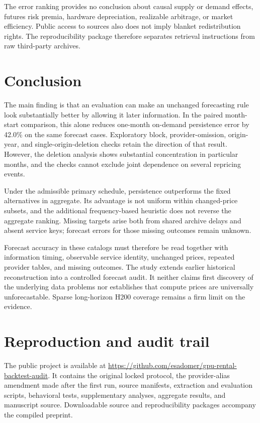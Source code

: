 \documentclass[10pt]{article}
\begin{document}
The error ranking provides no conclusion about causal supply or demand effects, futures risk premia, hardware depreciation, realizable arbitrage, or market efficiency. Public access to sources also does not imply blanket redistribution rights. The reproducibility package therefore separates retrieval instructions from raw third-party archives.

\section{Conclusion}

The main finding is that an evaluation can make an unchanged forecasting rule look substantially better by allowing it later information. In the paired month-start comparison, this alone reduces one-month on-demand persistence error by 42.0\% on the same forecast cases. Exploratory block, provider-omission, origin-year, and single-origin-deletion checks retain the direction of that result. However, the deletion analysis shows substantial concentration in particular months, and the checks cannot exclude joint dependence on several repricing events.

Under the admissible primary schedule, persistence outperforms the fixed alternatives in aggregate. Its advantage is not uniform within changed-price subsets, and the additional frequency-based heuristic does not reverse the aggregate ranking. Missing targets arise both from shared archive delays and absent service keys; forecast errors for those missing outcomes remain unknown.

Forecast accuracy in these catalogs must therefore be read together with information timing, observable service identity, unchanged prices, repeated provider tables, and missing outcomes. The study extends earlier historical reconstruction into a controlled forecast audit. It neither claims first discovery of the underlying data problems nor establishes that compute prices are universally unforecastable. Sparse long-horizon H200 coverage remains a firm limit on the evidence.

\appendix
\section{Reproduction and audit trail}

The public project is available at \url{https://github.com/esadomer/gpu-rental-backtest-audit}. It contains the original locked protocol, the provider-alias amendment made after the first run, source manifests, extraction and evaluation scripts, behavioral tests, supplementary analyses, aggregate results, and manuscript source. Downloadable source and reproducibility packages accompany the compiled preprint.
\end{document}
